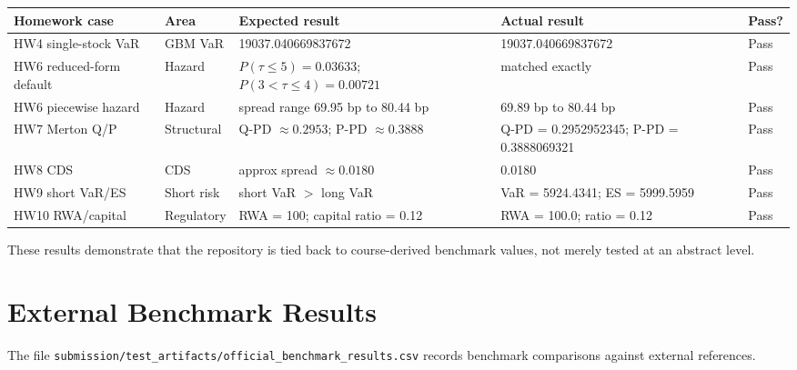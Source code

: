 \documentclass[11pt]{article}
\newcommand{\code}[1]{\texttt{#1}}
\begin{document}
\begin{center}
\small
\begin{tabular}{L{3cm}L{2cm}L{4.5cm}L{3.5cm}L{1.3cm}}
\toprule
\textbf{Homework case} & \textbf{Area} & \textbf{Expected result} & \textbf{Actual result} & \textbf{Pass?} \\
\midrule
HW4 single-stock VaR  & GBM VaR     & 19037.040669837672 & 19037.040669837672 & Pass \\
HW6 reduced-form default & Hazard    & $P(\tau \leq 5) = 0.03633$; $P(3 < \tau \leq 4) = 0.00721$ & matched exactly & Pass \\
HW6 piecewise hazard  & Hazard      & spread range 69.95 bp to 80.44 bp & 69.89 bp to 80.44 bp & Pass \\
HW7 Merton Q/P        & Structural  & Q-PD $\approx 0.2953$; P-PD $\approx 0.3888$ & Q-PD = 0.2952952345; P-PD = 0.3888069321 & Pass \\
HW8 CDS               & CDS         & approx spread $\approx 0.0180$ & 0.0180 & Pass \\
HW9 short VaR/ES      & Short risk  & short VaR $>$ long VaR & VaR = 5924.4341; ES = 5999.5959 & Pass \\
HW10 RWA/capital      & Regulatory  & RWA = 100; capital ratio = 0.12 & RWA = 100.0; ratio = 0.12 & Pass \\
\bottomrule
\end{tabular}
\end{center}

These results demonstrate that the repository is tied back to
course-derived benchmark values, not merely tested at an abstract level.

\section{External Benchmark Results}

\begin{sloppypar}
The file \code{submission/\allowbreak test\_artifacts/\allowbreak official\_\allowbreak benchmark\_results.csv}
records benchmark comparisons against external references.
\end{sloppypar}
\end{document}
